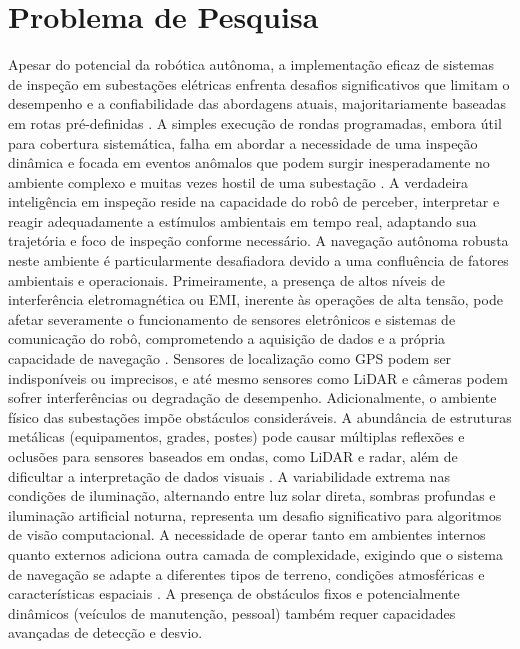 \section{Problema de Pesquisa}
Apesar do potencial da robótica autônoma, a implementação eficaz de sistemas de inspeção em subestações elétricas enfrenta desafios significativos que limitam o desempenho e a confiabilidade das abordagens atuais, majoritariamente baseadas em rotas pré-definidas \cite{TJH2b2023Trends}. A simples execução de rondas programadas, embora útil para cobertura sistemática, falha em abordar a necessidade de uma inspeção dinâmica e focada em eventos anômalos que podem surgir inesperadamente no ambiente complexo e muitas vezes hostil de uma subestação \cite{Wang2024Advancements}. A verdadeira inteligência em inspeção reside na capacidade do robô de perceber, interpretar e reagir adequadamente a estímulos ambientais em tempo real, adaptando sua trajetória e foco de inspeção conforme necessário.
A navegação autônoma robusta neste ambiente é particularmente desafiadora devido a uma confluência de fatores ambientais e operacionais. Primeiramente, a presença de altos níveis de interferência eletromagnética ou \ac{EMI}, inerente às operações de alta tensão, pode afetar severamente o funcionamento de sensores eletrônicos e sistemas de comunicação do robô, comprometendo a aquisição de dados e a própria capacidade de navegação \cite{Liu2016EMC,tdworld2024Challenges,Wang2024CombinedNav}. Sensores de localização como GPS podem ser indisponíveis ou imprecisos, e até mesmo sensores como \ac{LiDAR} e câmeras podem sofrer interferências ou degradação de desempenho.
Adicionalmente, o ambiente físico das subestações impõe obstáculos consideráveis. A abundância de estruturas metálicas (equipamentos, grades, postes) pode causar múltiplas reflexões e oclusões para sensores baseados em ondas, como \ac{LiDAR} e radar, além de dificultar a interpretação de dados visuais \cite{Wang2024CombinedNav, Hou2023ChallengesSolutions}. A variabilidade extrema nas condições de iluminação, alternando entre luz solar direta, sombras profundas e iluminação artificial noturna, representa um desafio significativo para algoritmos de visão computacional. A necessidade de operar tanto em ambientes internos quanto externos adiciona outra camada de complexidade, exigindo que o sistema de navegação se adapte a diferentes tipos de terreno, condições atmosféricas e características espaciais \cite{Hussain2020ReviewChallenges}. A presença de obstáculos fixos e potencialmente dinâmicos (veículos de manutenção, pessoal) também requer capacidades avançadas de detecção e desvio.
